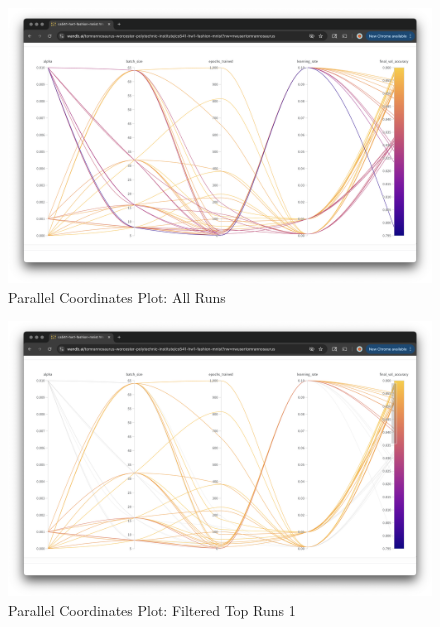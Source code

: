 \documentclass[
  letterpaper,
  DIV=11,
  numbers=noendperiod]{scrartcl}
\begin{document}
\begin{figure}[H]

{\centering \includegraphics{wandb_parallel_coordinates_plot1.png}

}

\caption{Parallel Coordinates Plot: All Runs}

\end{figure}%
\begin{figure}[H]

{\centering \includegraphics{wandb_parallel_coordinates_plot2.png}

}

\caption{Parallel Coordinates Plot: Filtered Top Runs 1}

\end{figure}%
\end{document}
